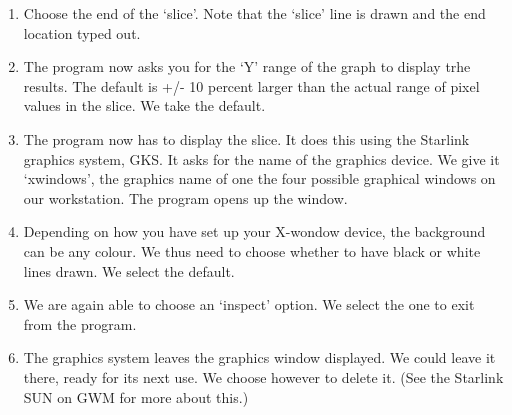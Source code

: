 \begin{small}
{{\begin{enumerate}
      position, and the typing out of the location.
\item Choose the end of the `slice'. Note that the `slice' line is
      drawn and the end location typed out.
\item The program now asks you for the `Y' range of the graph
      to display trhe results. The default is +/- 10 percent
      larger than the actual range of pixel values in the slice.
      We take the default.
\item The program now has to display the slice. It does this
      using the Starlink graphics system, GKS. It asks for the
      name of the graphics device. We give it `xwindows', the
      graphics name of one the four possible graphical windows
      on our workstation. The program opens up the window.
\item Depending on how you have set up your X-wondow device,
      the background can be any colour. We thus need to choose
      whether to have black or white lines drawn. We select
      the default.
\item We are again able to choose an `inspect' option. We select
      the one to exit from the program.
\item The graphics system leaves the graphics window displayed.
      We could leave it there, ready for its next use. We choose
      however to delete it. (See the Starlink SUN on GWM for more
      about this.)
\end{enumerate}


}}
\end{small}
